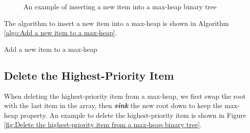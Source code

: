 \documentclass[12pt,a4paper]{ctexart}
\newcommand{\highlight}[1]{\textbf{\textit{#1}}}
\begin{document}
\begin{figure}[!htbp]
\begin{minipage}{0.5\textwidth}
        \end{minipage}
        \caption{An example of inserting a new item into a max-heap binary tree}
        \label{fig:Insert a new item into a max-heap binary tree}
    \end{figure}

    The algorithm to insert a new item into a max-heap is shown in Algorithm \ref{algo:Add a new item to a max-heap}.

    \begin{algorithm}[!htbp]
        \caption{Add a new item to a max-heap}
        \label{algo:Add a new item to a max-heap}
        \BlankLine
    \end{algorithm}

    \subsection{Delete the Highest-Priority Item}

    When deleting the highest-priority item from a max-heap, we first swap the root with the last item in the array, then \highlight{sink} the new root down to keep the max-heap property. An example to delete the highest-priority item is shown in Figure \ref{fig:Delete the highest-priority item from a max-heap binary tree}.
\end{document}
